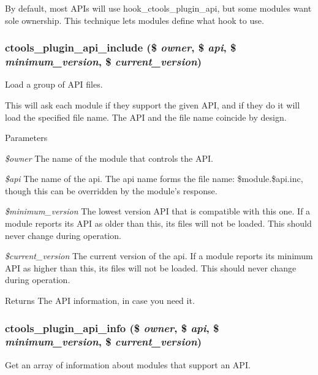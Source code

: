 By default, most APIs will use hook\_\-ctools\_\-plugin\_\-api, but some modules want sole ownership. This technique lets modules define what hook to use. \hypertarget{ctools_2includes_2plugins_8inc_acf1dd0bc77f5805d03dda03e32526ba9}{
\subsubsection[{ctools\_\-plugin\_\-api\_\-include}]{\setlength{\rightskip}{0pt plus 5cm}ctools\_\-plugin\_\-api\_\-include (\$ {\em owner}, \/  \$ {\em api}, \/  \$ {\em minimum\_\-version}, \/  \$ {\em current\_\-version})}}
\label{ctools_2includes_2plugins_8inc_acf1dd0bc77f5805d03dda03e32526ba9}
Load a group of API files.

This will ask each module if they support the given API, and if they do it will load the specified file name. The API and the file name coincide by design.


\begin{DoxyParams}{Parameters}
\item[{\em \$owner}]The name of the module that controls the API. \item[{\em \$api}]The name of the api. The api name forms the file name: \$module.\$api.inc, though this can be overridden by the module's response. \item[{\em \$minimum\_\-version}]The lowest version API that is compatible with this one. If a module reports its API as older than this, its files will not be loaded. This should never change during operation. \item[{\em \$current\_\-version}]The current version of the api. If a module reports its minimum API as higher than this, its files will not be loaded. This should never change during operation.\end{DoxyParams}
\begin{DoxyReturn}{Returns}
The API information, in case you need it. 
\end{DoxyReturn}
\hypertarget{ctools_2includes_2plugins_8inc_a68730edda9e1d2a3e90da8c4149cab43}{
\subsubsection[{ctools\_\-plugin\_\-api\_\-info}]{\setlength{\rightskip}{0pt plus 5cm}ctools\_\-plugin\_\-api\_\-info (\$ {\em owner}, \/  \$ {\em api}, \/  \$ {\em minimum\_\-version}, \/  \$ {\em current\_\-version})}}
\label{ctools_2includes_2plugins_8inc_a68730edda9e1d2a3e90da8c4149cab43}
Get an array of information about modules that support an API.

